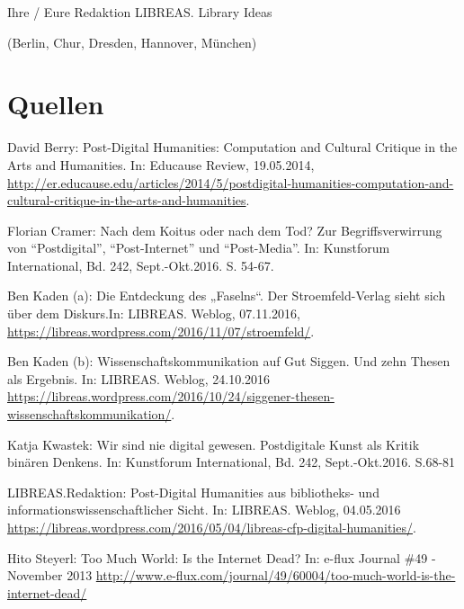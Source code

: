 \documentclass[a4paper,
fontsize=11pt,
oneside,
numbers=noperiodatend,
parskip=half-,
bibliography=totoc,
final
]{scrartcl}
\begin{document}
Ihre / Eure Redaktion LIBREAS. Library Ideas

(Berlin, Chur, Dresden, Hannover, München)

\section*{Quellen}\label{quellen}

David Berry: Post-Digital Humanities: Computation and Cultural Critique
in the Arts and Humanities. In: Educause Review, 19.05.2014,
\url{http://er.educause.edu/articles/2014/5/postdigital-humanities-computation-and-cultural-critique-in-the-arts-and-humanities}.

Florian Cramer: Nach dem Koitus oder nach dem Tod? Zur
Begriffsverwirrung von \enquote{Postdigital}, \enquote{Post-Internet}
und \enquote{Post-Media}. In: Kunstforum International, Bd. 242,
Sept.-Okt.2016. S. 54-67.

Ben Kaden (a): Die Entdeckung des „Faselns``. Der Stroemfeld-Verlag
sieht sich über dem Diskurs.In: LIBREAS. Weblog, 07.11.2016,
\url{https://libreas.wordpress.com/2016/11/07/stroemfeld/}.

Ben Kaden (b): Wissenschaftskommunikation auf Gut Siggen. Und zehn
Thesen als Ergebnis. In: LIBREAS. Weblog, 24.10.2016
\url{https://libreas.wordpress.com/2016/10/24/siggener-thesen-wissenschaftskommunikation/}.

Katja Kwastek: Wir sind nie digital gewesen. Postdigitale Kunst als
Kritik binären Denkens. In: Kunstforum International, Bd. 242,
Sept.-Okt.2016. S.68-81

LIBREAS.Redaktion: Post-Digital Humanities aus bibliotheks- und
informationswissenschaftlicher Sicht. In: LIBREAS. Weblog, 04.05.2016
\url{https://libreas.wordpress.com/2016/05/04/libreas-cfp-digital-humanities/}.

Hito Steyerl: Too Much World: Is the Internet Dead? In: e-flux Journal
\#49 - November 2013
\url{http://www.e-flux.com/journal/49/60004/too-much-world-is-the-internet-dead/}

\end{document}
